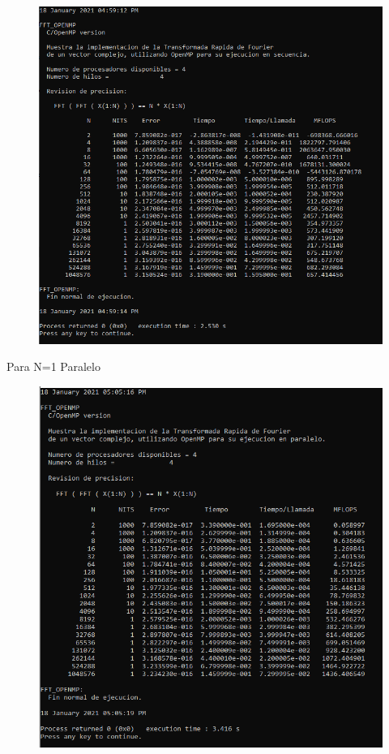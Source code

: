 \documentclass{report}
\begin{document}
\begin{figure}[h!]
    \centering
    \includegraphics[scale=.8]{Images/FFT_Sec_1.png}
    \label{Secuencial 1.1}
\end{figure}

\clearpage

Para N=1 Paralelo\medskip

\begin{figure}[h!]
    \centering
    \includegraphics[scale=.8]{Images/FFT_Par_1.png}
    \label{Paralelo 1.1}
\end{figure}
\end{document}
